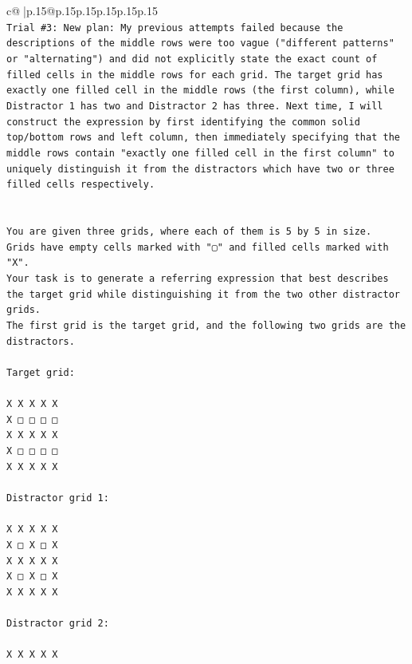 \documentclass{article}
\begin{document}
{\begin{supertabular}{c@{$\;$}|p{.15\linewidth}@{}p{.15\linewidth}p{.15\linewidth}p{.15\linewidth}p{.15\linewidth}p{.15\linewidth}}
{{{\\ 
\texttt{Trial \#3: New plan: My previous attempts failed because the descriptions of the middle rows were too vague ("different patterns" or "alternating") and did not explicitly state the exact count of filled cells in the middle rows for each grid. The target grid has exactly one filled cell in the middle rows (the first column), while Distractor 1 has two and Distractor 2 has three. Next time, I will construct the expression by first identifying the common solid top/bottom rows and left column, then immediately specifying that the middle rows contain "exactly one filled cell in the first column" to uniquely distinguish it from the distractors which have two or three filled cells respectively.} \\
\\ 
\\ 
\texttt{You are given three grids, where each of them is 5 by 5 in size.} \\
\texttt{Grids have empty cells marked with "▢" and filled cells marked with "X".} \\
\texttt{Your task is to generate a referring expression that best describes the target grid while distinguishing it from the two other distractor grids.} \\
\texttt{The first grid is the target grid, and the following two grids are the distractors.} \\
\\ 
\texttt{Target grid:} \\
\\ 
\texttt{X X X X X} \\
\texttt{X □ □ □ □} \\
\texttt{X X X X X} \\
\texttt{X □ □ □ □} \\
\texttt{X X X X X} \\
\\ 
\texttt{Distractor grid 1:} \\
\\ 
\texttt{X X X X X} \\
\texttt{X □ X □ X} \\
\texttt{X X X X X} \\
\texttt{X □ X □ X} \\
\texttt{X X X X X} \\
\\ 
\texttt{Distractor grid 2:} \\
\\ 
\texttt{X X X X X} \\
}}}
\end{supertabular}}
\end{document}
